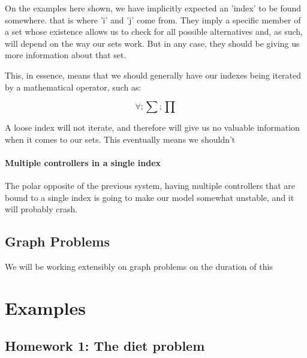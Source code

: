 \documentclass{textbook}
\begin{document}
On the examples here shown, we have implicitly expected an 'index' to be found somewhere. 
that is where 'i' and 'j' come from. They imply a specific member of a set whose existence
allows us to check for all possible alternatives and, as such, will depend on the way our sets
work. But in any case, they should be giving us more information about that set. 

This, in essence, means that we should generally have our indexes being iterated by a mathematical 
operator, such as: 

$$\forall ; \sum ; \prod$$

A loose index will not iterate, and therefore will give us no valuable information when it comes to
our sets. This eventually means we shouldn't 

\subsubsection{Multiple controllers in a single index}

The polar opposite of the previous system, having multiple controllers that are 
bound to a single index is going to make our model somewhat unstable, and it will probably crash.

\subsubsection{}

\section{Graph Problems}

We will be working extensibly on graph problems on the duration of 
this 

\chapter{Examples}

\section[Homework 1]{Homework 1: The diet problem}
\end{document}
